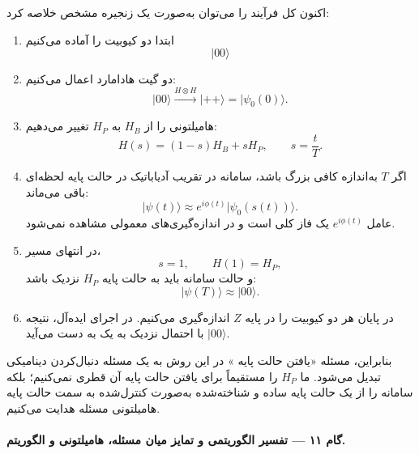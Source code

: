 اکنون کل فرآیند را می‌توان به‌صورت یک زنجیره مشخص خلاصه کرد:

\begin{enumerate}
	\item ابتدا دو کیوبیت را آماده می‌کنیم
	\begin{equation}
		\lvert00\rangle
	\end{equation}
	
	
	\item دو گیت هادامارد اعمال می‌کنیم:
	\begin{equation}
		\lvert00\rangle
		\xrightarrow{H\otimes H}
		\lvert++\rangle
		=
		\lvert\psi_0(0)\rangle.
	\end{equation}
	
	\item هامیلتونی را از $H_B$ به $H_P$ تغییر می‌دهیم:
	\begin{equation}
		H(s)
		=
		(1-s)H_B+sH_P,
		\qquad
		s=\frac{t}{T}.
	\end{equation}
	
	\item اگر $T$ به‌اندازه کافی بزرگ باشد، سامانه در تقریب آدیاباتیک در حالت پایه لحظه‌ای باقی می‌ماند:
	\begin{equation}
		\lvert\psi(t)\rangle
		\approx
		e^{i\phi(t)}
		\lvert\psi_0(s(t))\rangle.
	\end{equation}
	عامل $e^{i\phi(t)}$ یک فاز کلی است و در اندازه‌گیری‌های معمولی مشاهده نمی‌شود.
	
	\item در انتهای مسیر،
	\begin{equation}
		s=1,
		\qquad
		H(1)=H_P,
	\end{equation}
	و حالت سامانه باید به حالت پایه $H_P$ نزدیک باشد:
	\begin{equation}
		\lvert\psi(T)\rangle
		\approx
		\lvert00\rangle.
	\end{equation}
	
	\item در پایان هر دو کیوبیت را در پایه $Z$ اندازه‌گیری می‌کنیم. در اجرای ایده‌آل، نتیجه $\lvert00\rangle$ با احتمال نزدیک به یک به دست می‌آید.
\end{enumerate}

بنابراین، مسئله «یافتن حالت پایه » در این روش به یک مسئله دنبال‌کردن دینامیکی تبدیل می‌شود. ما $H_P$ را مستقیماً برای یافتن حالت پایه آن قطری نمی‌کنیم؛ بلکه سامانه را از یک حالت پایه ساده و شناخته‌شده به‌صورت کنترل‌شده به سمت حالت پایه هامیلتونی مسئله هدایت می‌کنیم.

\paragraph{گام ۱۱ --- تفسیر الگوریتمی و تمایز میان مسئله، هامیلتونی و الگوریتم.}

